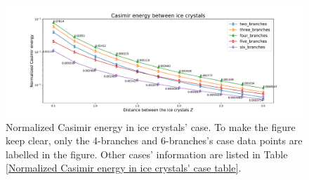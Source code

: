    \begin{figure}[H]
        \centering
        \hspace*{-1cm}\includegraphics[scale = 0.5]{figures/CasE_ice_crystals.pdf}
        \caption{Normalized Casimir energy in ice crystals' case. To make the figure keep clear, only the 4-branches and 6-branches's case data points 
        are labelled in the figure. Other cases' information are listed in Table \ref{Normalized Casimir energy in ice crystals' case table}. }
        \label{Normalized Casimir energy in ice crystals' case}
    \end{figure}

